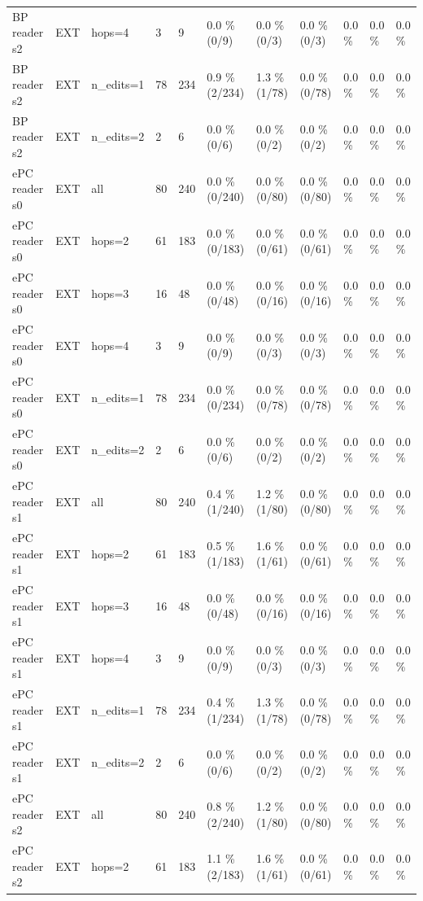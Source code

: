 \documentclass[10pt,a4paper]{article}
\begin{document}
\begin{center}
\begin{tabularx}{\textwidth}{@{}p{}XXXXXXXXXX@{}}
BP reader s2 & EXT & hops=4 & 3 & 9 & 0.0 \% (0/9) & 0.0 \% (0/3) & 0.0 \% (0/3) & 0.0 \% & 0.0 \% & 0.0 \% \\
BP reader s2 & EXT & n\_edits=1 & 78 & 234 & 0.9 \% (2/234) & 1.3 \% (1/78) & 0.0 \% (0/78) & 0.0 \% & 0.0 \% & 0.0 \% \\
BP reader s2 & EXT & n\_edits=2 & 2 & 6 & 0.0 \% (0/6) & 0.0 \% (0/2) & 0.0 \% (0/2) & 0.0 \% & 0.0 \% & 0.0 \% \\
ePC reader s0 & EXT & all & 80 & 240 & 0.0 \% (0/240) & 0.0 \% (0/80) & 0.0 \% (0/80) & 0.0 \% & 0.0 \% & 0.0 \% \\
ePC reader s0 & EXT & hops=2 & 61 & 183 & 0.0 \% (0/183) & 0.0 \% (0/61) & 0.0 \% (0/61) & 0.0 \% & 0.0 \% & 0.0 \% \\
ePC reader s0 & EXT & hops=3 & 16 & 48 & 0.0 \% (0/48) & 0.0 \% (0/16) & 0.0 \% (0/16) & 0.0 \% & 0.0 \% & 0.0 \% \\
ePC reader s0 & EXT & hops=4 & 3 & 9 & 0.0 \% (0/9) & 0.0 \% (0/3) & 0.0 \% (0/3) & 0.0 \% & 0.0 \% & 0.0 \% \\
ePC reader s0 & EXT & n\_edits=1 & 78 & 234 & 0.0 \% (0/234) & 0.0 \% (0/78) & 0.0 \% (0/78) & 0.0 \% & 0.0 \% & 0.0 \% \\
ePC reader s0 & EXT & n\_edits=2 & 2 & 6 & 0.0 \% (0/6) & 0.0 \% (0/2) & 0.0 \% (0/2) & 0.0 \% & 0.0 \% & 0.0 \% \\
ePC reader s1 & EXT & all & 80 & 240 & 0.4 \% (1/240) & 1.2 \% (1/80) & 0.0 \% (0/80) & 0.0 \% & 0.0 \% & 0.0 \% \\
ePC reader s1 & EXT & hops=2 & 61 & 183 & 0.5 \% (1/183) & 1.6 \% (1/61) & 0.0 \% (0/61) & 0.0 \% & 0.0 \% & 0.0 \% \\
ePC reader s1 & EXT & hops=3 & 16 & 48 & 0.0 \% (0/48) & 0.0 \% (0/16) & 0.0 \% (0/16) & 0.0 \% & 0.0 \% & 0.0 \% \\
ePC reader s1 & EXT & hops=4 & 3 & 9 & 0.0 \% (0/9) & 0.0 \% (0/3) & 0.0 \% (0/3) & 0.0 \% & 0.0 \% & 0.0 \% \\
ePC reader s1 & EXT & n\_edits=1 & 78 & 234 & 0.4 \% (1/234) & 1.3 \% (1/78) & 0.0 \% (0/78) & 0.0 \% & 0.0 \% & 0.0 \% \\
ePC reader s1 & EXT & n\_edits=2 & 2 & 6 & 0.0 \% (0/6) & 0.0 \% (0/2) & 0.0 \% (0/2) & 0.0 \% & 0.0 \% & 0.0 \% \\
ePC reader s2 & EXT & all & 80 & 240 & 0.8 \% (2/240) & 1.2 \% (1/80) & 0.0 \% (0/80) & 0.0 \% & 0.0 \% & 0.0 \% \\
ePC reader s2 & EXT & hops=2 & 61 & 183 & 1.1 \% (2/183) & 1.6 \% (1/61) & 0.0 \% (0/61) & 0.0 \% & 0.0 \% & 0.0 \% \\

\end{tabularx}
\end{center}
\end{document}

